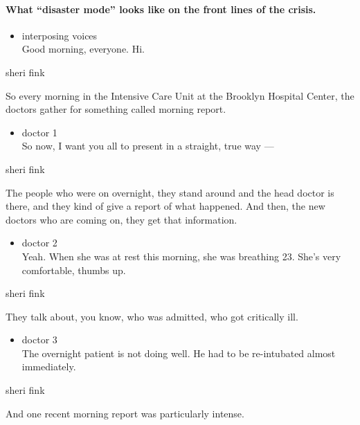 \hypertarget{what-disaster-mode-looks-like-on-the-front-lines-of-the-crisis}{%
\paragraph{What ``disaster mode'' looks like on the front lines of the
crisis.}\label{what-disaster-mode-looks-like-on-the-front-lines-of-the-crisis}}

\begin{itemize}
\tightlist
\item
  interposing voices\\
  Good morning, everyone. Hi.
\end{itemize}

sheri fink

So every morning in the Intensive Care Unit at the Brooklyn Hospital
Center, the doctors gather for something called morning report.

\begin{itemize}
\tightlist
\item
  doctor 1\\
  So now, I want you all to present in a straight, true way ---
\end{itemize}

sheri fink

The people who were on overnight, they stand around and the head doctor
is there, and they kind of give a report of what happened. And then, the
new doctors who are coming on, they get that information.

\begin{itemize}
\tightlist
\item
  doctor 2\\
  Yeah. When she was at rest this morning, she was breathing 23. She's
  very comfortable, thumbs up.
\end{itemize}

sheri fink

They talk about, you know, who was admitted, who got critically ill.

\begin{itemize}
\tightlist
\item
  doctor 3\\
  The overnight patient is not doing well. He had to be re-intubated
  almost immediately.
\end{itemize}

sheri fink

And one recent morning report was particularly intense.

